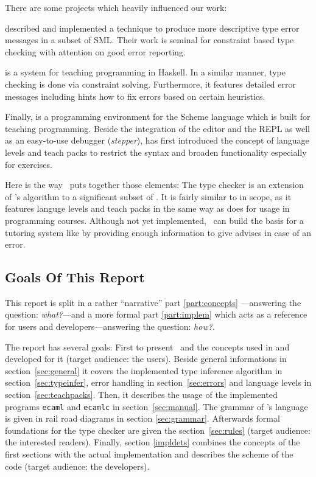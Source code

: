There are some projects which heavily influenced our work:

\citet{haackwells04} described and implemented a technique to produce more
descriptive type error messages in a subset of SML.  
Their work is seminal for constraint based type checking with attention 
on good error reporting.

 \citep{helium-hw03} is a system for teaching programming 
in Haskell. In a similar manner, type checking is done via constraint 
solving. Furthermore, it features detailed error messages including 
hints how to fix errors based on certain heuristics.

Finally,  \citep{Felleisen98thedrscheme} is a programming 
environment for the Scheme language which is built for teaching
programming.  Beside the integration of the editor and the REPL as well as an
easy-to-use debugger (\emph{stepper}),  has first introduced
the concept of language levels and teach packs to restrict the syntax and
broaden functionality especially for exercises.

Here is the way \easyocaml\ puts together those elements: The type checker is an
extension of \citet{haackwells04}'s  algorithm to a significant subset of
\ocaml. It is fairly similar to  in scope, as it features languge levels
and teach packs in the same way as  does for usage in programming
courses. Although not yet implemented, \easyocaml\ can build the basis for a
tutoring system like  by providing enough information to give
advises in case of an error.


\subsection*{Goals Of This Report}

This report is split in a rather ``narrative'' part \ref{part:concepts}%
---answering the question: \emph{what?}---and a more formal part \ref{part:implem}
which acts as a reference for users and developers---answering the question:
\emph{how?}.

The report has several goals:
First to present \easyocaml\ and the concepts used in and developed for it
(target audience: the users). Beside general informations in
section~\ref{sec:general} it covers the implemented type inference algorithm in
section~\ref{sec:typeinfer}, error handling in section~\ref{sec:errors} and
language levels in section~\ref{sec:teachpacks}.
Then, it describes the usage of the implemented programs \texttt{ecaml} and
\texttt{ecamlc} in section~\ref{sec:manual}.
The grammar of \easyocaml's language is given in rail road diagrams in section
\ref{sec:grammar}.
Afterwards formal foundations for the type checker are given the
section~\ref{sec:rules} (target audience: the interested readers).
Finally, section \ref{impldets} combines the concepts of the first sections with
the actual implementation and describes the scheme of the code (target audience:
the developers).

